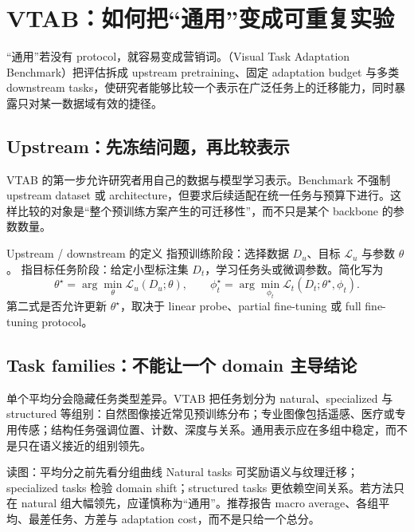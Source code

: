 \section{VTAB：如何把“通用”变成可重复实验}

“通用”若没有 protocol，就容易变成营销词。（Visual Task Adaptation Benchmark）把评估拆成 upstream pretraining、固定 adaptation budget 与多类 downstream tasks，使研究者能够比较一个表示在广泛任务上的迁移能力，同时暴露只对某一数据域有效的捷径。

\subsection{Upstream：先冻结问题，再比较表示}

VTAB 的第一步允许研究者用自己的数据与模型学习表示。Benchmark 不强制 upstream dataset 或 architecture，但要求后续适配在统一任务与预算下进行。这样比较的对象是“整个预训练方案产生的可迁移性”，而不只是某个 backbone 的参数数量。


\begin{importantbox}{Upstream / downstream 的定义}
 指预训练阶段：选择数据 $D_u$、目标 $\mathcal{L}_u$ 与参数 $\theta$。 指目标任务阶段：给定小型标注集 $D_t$，学习任务头或微调参数。简化写为
\[
\theta^{\star}=\arg\min_{\theta}\mathcal{L}_u(D_u;\theta),\qquad
\phi_t^{\star}=\arg\min_{\phi_t}\mathcal{L}_t(D_t;\theta^{\star},\phi_t).
\]
第二式是否允许更新 $\theta^{\star}$，取决于 linear probe、partial fine-tuning 或 full fine-tuning protocol。
\end{importantbox}

\subsection{Task families：不能让一个 domain 主导结论}

单个平均分会隐藏任务类型差异。VTAB 把任务划分为 natural、specialized 与 structured 等组别：自然图像接近常见预训练分布；专业图像包括遥感、医疗或专用传感；结构任务强调位置、计数、深度与关系。通用表示应在多组中稳定，而不是只在语义接近的组别领先。


\begin{knowledgebox}{读图：平均分之前先看分组曲线}
Natural tasks 可奖励语义与纹理迁移；specialized tasks 检验 domain shift；structured tasks 更依赖空间关系。若方法只在 natural 组大幅领先，应谨慎称为“通用”。推荐报告 macro average、各组平均、最差任务、方差与 adaptation cost，而不是只给一个总分。
\end{knowledgebox}

